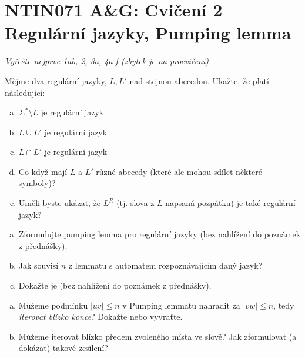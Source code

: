 \documentclass[a4paper,12pt]{amsart}
\begin{document}

\section*{NTIN071 A\&G: Cvičení 2 -- Regulární jazyky, Pumping lemma}


\medskip

\noindent\emph{Vyřešte nejprve 1ab, 2, 3a, 4a-f (zbytek je na procvičení).}

\medskip\begin{problem}

    Mějme dva regulární jazyky, $L,L'$ nad stejnou abecedou. Ukažte, že platí následující:
  
    \medskip
    
    \begin{enumerate}[(a)]\setlength\itemsep{12pt}
        \item $\Sigma^*\setminus L$ je regulární jazyk
        \item $L\cup L'$ je regulární jazyk  
        \item $L\cap L'$ je regulární jazyk
        \item Co když mají $L$ a $L'$ různé abecedy (které ale mohou sdílet některé symboly)?
        \item Uměli byste ukázat, že $L^R$ (tj. slova z $L$ napsaná pozpátku) je také regulární jazyk?
    \end{enumerate}
    
\end{problem}


\medskip\begin{problem}

    \begin{enumerate}[(a)]\setlength\itemsep{12pt}
        \item Zformulujte pumping lemma pro regulární jazyky (bez nahlížení do poznámek z přednášky).
        \item Jak souvisí $n$ z lemmatu s automatem rozpoznávajícím daný jazyk?
        \item Dokažte je (bez nahlížení do poznámek z přednášky).
    \end{enumerate}

\end{problem}


\medskip\begin{problem}

    \begin{enumerate}[(a)]\setlength\itemsep{12pt}
        \item Můžeme podmínku $|uv|\leq n$ v Pumping lemmatu nahradit za $|vw|\leq n$, tedy \emph{iterovat blízko konce}? Dokažte nebo vyvraťte.
        \item Můžeme iterovat blízko předem zvoleného místa ve slově? Jak zformulovat (a dokázat) takové zesílení?
    \end{enumerate}

\end{problem}
\end{document}
